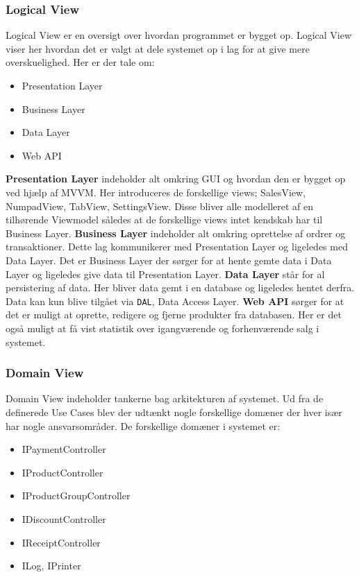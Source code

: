 \subsubsection{Logical View}
Logical View er en oversigt over hvordan programmet er bygget op. Logical View viser her hvordan det er valgt at dele systemet op i lag for at give mere overskuelighed. Her er der tale om:
\begin{itemize}
	\item Presentation Layer
	\item Business Layer
	\item Data Layer
	\item Web API
\end{itemize}
 
\textbf{Presentation Layer} indeholder alt omkring GUI og hvordan den er bygget op ved hjælp af MVVM. Her introduceres de forskellige views; SalesView, NumpadView, TabView, SettingsView. Disse bliver alle modelleret af en tilhørende Viewmodel således at de forskellige views intet kendskab har til Business Layer. \textbf{Business Layer} indeholder alt omkring oprettelse af ordrer og transaktioner. Dette lag kommunikerer med Presentation Layer og ligeledes med Data Layer. Det er Business Layer der sørger for at hente gemte data i Data Layer og ligeledes give data til Presentation Layer.\newline
\textbf{Data Layer} står for al persistering af data. Her bliver data gemt i en database og ligeledes hentet derfra. Data kan kun blive tilgået via \texttt{DAL}, Data Access Layer.\newline
\textbf{Web API} sørger for at det er muligt at oprette, redigere og fjerne produkter fra databasen. Her er det også muligt at få vist statistik over igangværende og forhenværende salg i systemet. 

\subsubsection{Domain View}
Domain View indeholder tankerne bag arkitekturen af systemet. Ud fra de definerede Use Cases blev der udtænkt nogle forskellige domæner der hver især har nogle ansvarsområder.\newline
De forskellige domæner i systemet er:\newline
\begin{itemize}
	\item IPaymentController
	\item IProductController
	\item IProductGroupController
	\item IDiscountController
	\item IReceiptController
	\item ILog, IPrinter
\end{itemize}	


